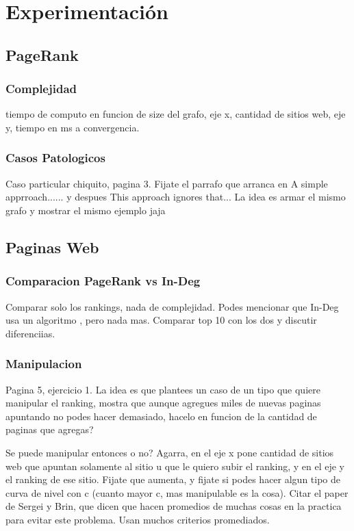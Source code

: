 \section{Experimentación}

\subsection{PageRank}
\subsubsection{Complejidad}
tiempo de computo en funcion de size del grafo, eje x, cantidad de sitios web, eje y, tiempo en ms a convergencia.

\subsubsection{Casos Patologicos}
Caso particular chiquito, pagina 3. Fijate el parrafo que arranca en A simple apprroach...... y despues This approach ignores that... La idea es armar el mismo grafo y mostrar el mismo ejemplo jaja

\subsection{Paginas Web}

\subsubsection{Comparacion PageRank vs In-Deg}
Comparar solo los rankings, nada de complejidad. Podes mencionar que In-Deg usa un algoritmo , pero nada mas. Comparar top 10 con los dos y discutir diferenciias.

\subsubsection{Manipulacion}
Pagina 5, ejercicio 1. La idea es que plantees un caso de un tipo que quiere manipular el ranking, mostra que aunque agregues miles de nuevas paginas apuntando no podes hacer demasiado, hacelo en funcion de la cantidad de paginas que agregas?

Se puede manipular entonces o no? Agarra, en el eje x pone cantidad de sitios web que apuntan solamente al sitio u que le quiero subir el ranking, y en el eje y el ranking de ese sitio. Fijate que aumenta, y fijate si podes hacer algun tipo de curva de nivel con c (cuanto mayor c, mas manipulable es la cosa). Citar el paper de Sergei y Brin, que dicen que hacen promedios de muchas cosas en la practica para evitar este problema. Usan muchos criterios promediados.

